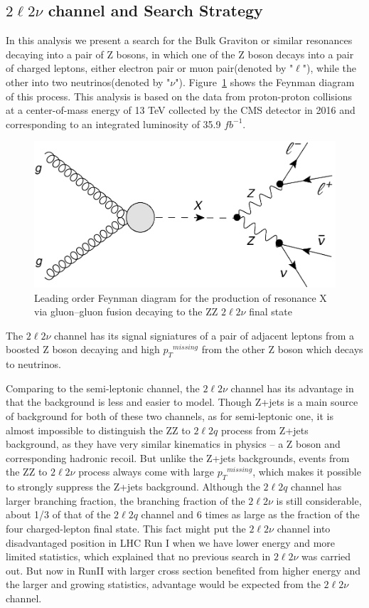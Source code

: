 \subsection{$2\ell 2\nu$ channel and  Search Strategy}
In this analysis we present a search for the Bulk Graviton or similar resonances decaying into a pair of Z bosons, in which one of the Z boson decays into a pair of charged leptons, either electron pair or muon pair(denoted by "$\ell$"), while the other into two neutrinos(denoted by "$\nu$"). Figure~\ref{fig:intro_llnndiagram} shows the Feynman diagram of this process. This analysis is based on the data from proton-proton collisions at a center-of-mass energy of 13 TeV collected by the CMS detector in 2016 and corresponding to an integrated luminosity of 35.9 $fb^{-1}$. 
\begin{figure}[htbp]
\begin{center}
\includegraphics[width=0.72\linewidth]{figures/intro_llnndiagram.pdf}
\caption{Leading order Feynman diagram for the production of resonance X via gluon–gluon fusion decaying to the ZZ $2\ell 2\nu$ final state}
\label{fig:intro_llnndiagram}
\end{center}
\end{figure}
The $2\ell 2\nu$ channel has its signal signiatures of a pair of adjacent leptons from a boosted Z boson decaying and high ${p_{T}}^{missing}$ from the other Z boson which decays to neutrinos.

\vspace{0.3cm}
Comparing to the semi-leptonic channel, the $2\ell 2\nu$ channel has its advantage in that the background is less and easier to model. Though Z+jets is a main source of background for both of these two channels, as for semi-leptonic one, it is almost impossible to distinguish the ZZ to $2\ell 2q$ process from Z+jets background, as they have very similar kinematics in physics -- a Z boson and corresponding hadronic recoil. But unlike the Z+jets backgrounds, events from the ZZ to $2\ell 2\nu$ process always come with large ${p_{T}}^{missing}$, which makes it possible to strongly suppress the Z+jets background. Although the $2\ell 2q$ channel has larger branching fraction, the branching fraction of the $2\ell 2\nu$ is still considerable, about 1/3 of that of the $2\ell 2q$ channel and 6 times as large as the fraction of the four charged-lepton final state. This fact might put the $2\ell 2\nu$ channel into disadvantaged position in LHC Run I when we have lower energy and more limited statistics, which explained that no previous search in $2\ell 2\nu$ was carried out. But now in RunII with larger cross section benefited from higher energy and the larger and growing statistics, advantage would be expected from the $2\ell 2\nu$ channel.

